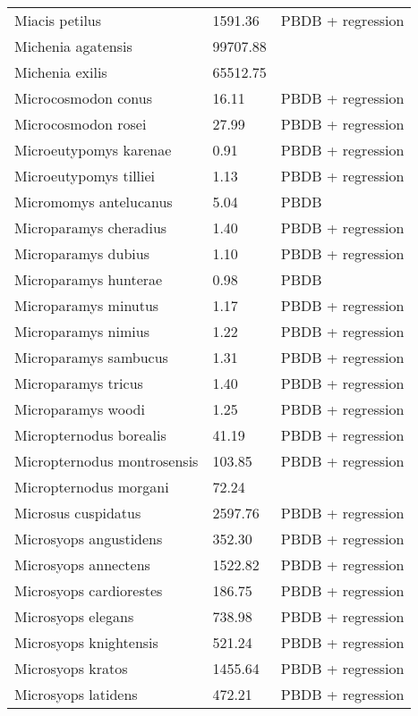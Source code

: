 \documentclass{article}
\begin{document}
\begin{center}
\begin{longtable}{p{} p{} p{}}
    Miacis petilus & 1591.36 & PBDB + regression \\ 
    Michenia agatensis & 99707.88 & \cite{Tomiya2013} \\ 
    Michenia exilis & 65512.75 & \cite{Tomiya2013} \\ 
    Microcosmodon conus & 16.11 & PBDB + regression \\ 
    Microcosmodon rosei & 27.99 & PBDB + regression \\ 
    Microeutypomys karenae & 0.91 & PBDB + regression \\ 
    Microeutypomys tilliei & 1.13 & PBDB + regression \\ 
    Micromomys antelucanus & 5.04 & PBDB \\ 
    Microparamys cheradius & 1.40 & PBDB + regression \\ 
    Microparamys dubius & 1.10 & PBDB + regression \\ 
    Microparamys hunterae & 0.98 & PBDB \\ 
    Microparamys minutus & 1.17 & PBDB + regression \\ 
    Microparamys nimius & 1.22 & PBDB + regression \\ 
    Microparamys sambucus & 1.31 & PBDB + regression \\ 
    Microparamys tricus & 1.40 & PBDB + regression \\ 
    Microparamys woodi & 1.25 & PBDB + regression \\ 
    Micropternodus borealis & 41.19 & PBDB + regression \\ 
    Micropternodus montrosensis & 103.85 & PBDB + regression \\ 
    Micropternodus morgani & 72.24 & \cite{Tomiya2013} \\ 
    Microsus cuspidatus & 2597.76 & PBDB + regression \\ 
    Microsyops angustidens & 352.30 & PBDB + regression \\ 
    Microsyops annectens & 1522.82 & PBDB + regression \\ 
    Microsyops cardiorestes & 186.75 & PBDB + regression \\ 
    Microsyops elegans & 738.98 & PBDB + regression \\ 
    Microsyops knightensis & 521.24 & PBDB + regression \\ 
    Microsyops kratos & 1455.64 & PBDB + regression \\ 
    Microsyops latidens & 472.21 & PBDB + regression \\ 

\end{longtable}
\end{center}
\end{document}
